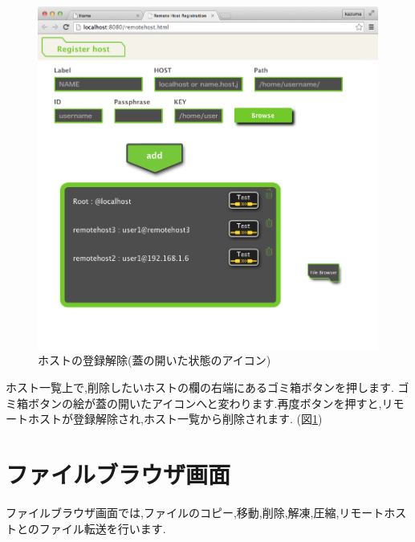 \documentclass[a4paper,10pt,oneside]{jsbook}
\begin{document}
\begin{figure}[htbp]
	\begin{center}
		\includegraphics[width=12.0cm]{image/remotehost_002.png}
	\end{center}
	\caption{ホストの登録解除(蓋の開いた状態のアイコン)}
	\label{fig:remotedelete}
\end{figure}


ホスト一覧上で,削除したいホストの欄の右端にあるゴミ箱ボタンを押します.
ゴミ箱ボタンの絵が蓋の開いたアイコンへと変わります.再度ボタンを押すと,リモートホストが登録解除され,ホスト一覧から削除されます.
(図\ref{fig:remotedelete})


\chapter{ファイルブラウザ画面} 
\label{chap:filebrowser}
ファイルブラウザ画面では,ファイルのコピー,移動,削除,解凍,圧縮,リモートホストとのファイル転送を行います.
\end{document}
